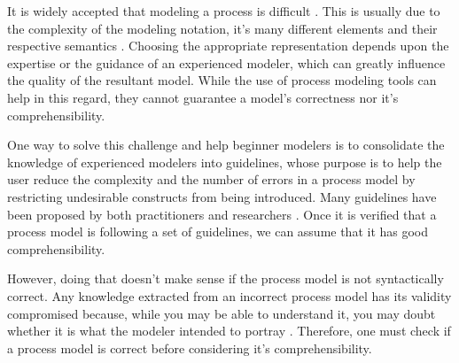 \documentclass{llncs}
\begin{document}
It is widely accepted that modeling a process is difficult \cite{7PMG}. This is usually due to the complexity of the modeling notation, it's many different elements and their respective semantics \cite{What we can learn from Quality Issues of BPMN Models from Industry}. Choosing the appropriate representation depends upon the expertise or the guidance of an experienced modeler, which can greatly influence the quality of the resultant model. While the use of process modeling tools can help in this regard, they cannot guarantee a model's correctness nor it's comprehensibility.



One way to solve this challenge and help beginner modelers is to consolidate the knowledge of experienced modelers into guidelines, whose purpose is to help the user reduce the complexity and the number of errors in a process model by restricting undesirable constructs from being introduced. Many guidelines have been proposed by both practitioners \cite{Silver2009} \cite{White2008} \cite{Allweyer2010} and researchers \cite{Becker2000} \cite{Mendling2007} \cite{Vanderfeesten2008} \cite{Correia2012}. Once it is verified that a process model is following a set of guidelines, we can assume that it has good comprehensibility.


However, %
doing that doesn't make sense if the process model is not syntactically correct. Any knowledge extracted from an incorrect process model has its validity compromised because, while you may be able to understand it, you may doubt whether it is what the modeler intended to portray \cite{Reijers2015}. Therefore, one must check if a process model is correct before considering it's comprehensibility.
\end{document}
